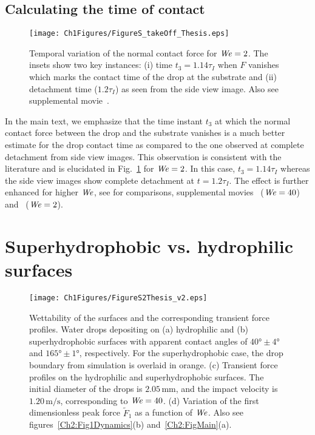 \begin{subappendices}
	\subsection{Calculating the time of contact}
	
		\begin{figure}
		\centering
		\texttt{[image: Ch1Figures/FigureS\_takeOff\_Thesis.eps]}
		\caption{Temporal variation of the normal contact force for $\mathit{We} = 2$. The insets show two key instances: (i) time $t_3 = 1.14\tau_I$ when $F$ vanishes which marks the contact time of the drop at the substrate and (ii) detachment time ($1.2\tau_I$) as seen from the side view image. Also see supplemental movie~.}
		\label{Fig_TakeOff}
	\end{figure}
	
	In the main text, we emphasize that the time instant $t_3$ at which the normal contact force between the drop and the substrate vanishes is a much better estimate for the drop contact time as compared to the one observed at complete detachment from side view images. This observation is consistent with the literature \cite{bouwhuis2012, van2012direct, lee2020drop,  chantelot_lohse_2021} and is elucidated in Fig.~\ref{Fig_TakeOff} for $\mathit{We} = 2$. In this case, $t_3 = 1.14\tau_I$ whereas the side view images show complete detachment at $t = 1.2\tau_I$. The effect is further enhanced for higher $\mathit{We}$, see for comparisons, supplemental movies~ ($\mathit{We} = 40$) and~ ($\mathit{We} = 2$).
	
	\section{Superhydrophobic vs. hydrophilic surfaces}\label{Ch2:SecPhobicPhilic}
	
	\begin{figure}
		\texttt{[image: Ch1Figures/FigureS2Thesis\_v2.eps]}
		\caption{Wettability of the surfaces and the corresponding transient force profiles. Water drops depositing on (a) hydrophilic and (b) superhydrophobic surfaces with apparent contact angles of $40\si{\degree} \pm 4\si{\degree}$ and $165\si{\degree} \pm 1\si{\degree}$, respectively. For the superhydrophobic case, the drop boundary from simulation is overlaid in orange. (c) Transient force profiles on the hydrophilic and superhydrophobic surfaces. The initial diameter of the drops is $2.05\,\si{\milli\meter}$, and the impact velocity is $1.20\,\si{\meter}/\si{\second}$, corresponding to $\mathit{We} = 40$. (d) Variation of the first dimensionless peak force $\tilde{F}_1$ as a function of $\mathit{We}$.  Also see figures~\ref{Ch2:Fig1Dynamics}(b) and~\ref{Ch2:FigMain}(a).}
		\label{Ch2:Fig_phobicphilic}
	\end{figure}
	

\end{subappendices}
